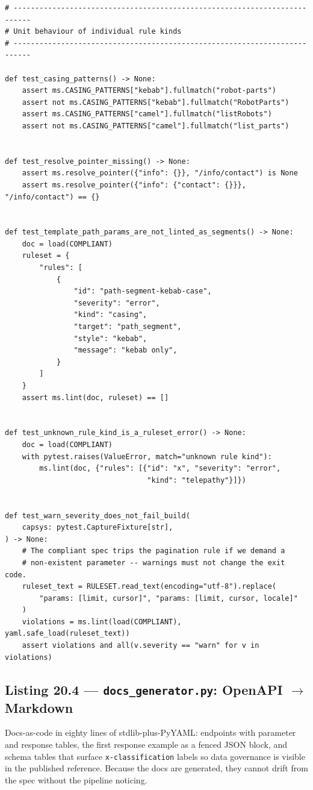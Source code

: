 \begin{verbatim}
# --------------------------------------------------------------------------
# Unit behaviour of individual rule kinds
# --------------------------------------------------------------------------

def test_casing_patterns() -> None:
    assert ms.CASING_PATTERNS["kebab"].fullmatch("robot-parts")
    assert not ms.CASING_PATTERNS["kebab"].fullmatch("RobotParts")
    assert ms.CASING_PATTERNS["camel"].fullmatch("listRobots")
    assert not ms.CASING_PATTERNS["camel"].fullmatch("list_parts")


def test_resolve_pointer_missing() -> None:
    assert ms.resolve_pointer({"info": {}}, "/info/contact") is None
    assert ms.resolve_pointer({"info": {"contact": {}}}, "/info/contact") == {}


def test_template_path_params_are_not_linted_as_segments() -> None:
    doc = load(COMPLIANT)
    ruleset = {
        "rules": [
            {
                "id": "path-segment-kebab-case",
                "severity": "error",
                "kind": "casing",
                "target": "path_segment",
                "style": "kebab",
                "message": "kebab only",
            }
        ]
    }
    assert ms.lint(doc, ruleset) == []


def test_unknown_rule_kind_is_a_ruleset_error() -> None:
    doc = load(COMPLIANT)
    with pytest.raises(ValueError, match="unknown rule kind"):
        ms.lint(doc, {"rules": [{"id": "x", "severity": "error",
                                 "kind": "telepathy"}]})


def test_warn_severity_does_not_fail_build(
    capsys: pytest.CaptureFixture[str],
) -> None:
    # The compliant spec trips the pagination rule if we demand a
    # non-existent parameter -- warnings must not change the exit code.
    ruleset_text = RULESET.read_text(encoding="utf-8").replace(
        "params: [limit, cursor]", "params: [limit, cursor, locale]"
    )
    violations = ms.lint(load(COMPLIANT), yaml.safe_load(ruleset_text))
    assert violations and all(v.severity == "warn" for v in violations)
\end{verbatim}

\subsection{Listing 20.4 --- \texttt{docs\_generator.py}: OpenAPI $\rightarrow$ Markdown}
\label{sec:ch20-listing-docs}

Docs-as-code in eighty lines of stdlib-plus-PyYAML: endpoints with
parameter and response tables, the first response example as a fenced JSON
block, and schema tables that surface \texttt{x-classification} labels so
data governance is visible in the published reference. Because the docs
are generated, they cannot drift from the spec without the pipeline
noticing.

